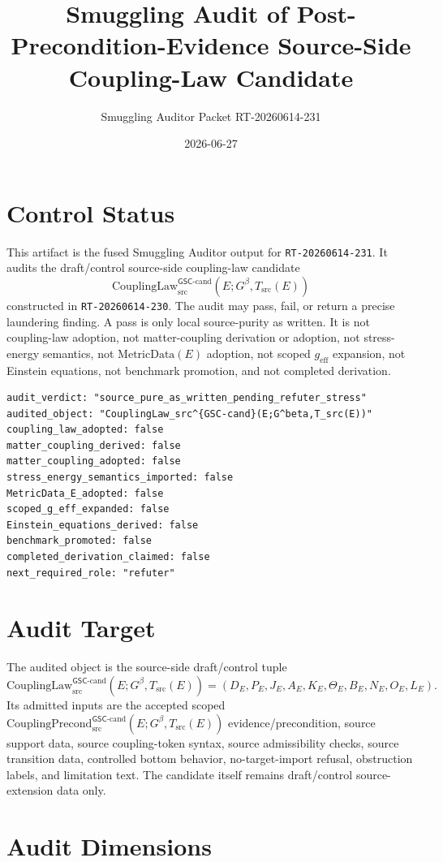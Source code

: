 \documentclass[11pt]{article}
\title{Smuggling Audit of Post-Precondition-Evidence Source-Side Coupling-Law Candidate}
\author{Smuggling Auditor Packet RT-20260614-231}
\date{2026-06-27}
\newcommand{\Gbeta}{G^\beta}
\newcommand{\geff}{g_{\mathrm{eff}}}
\newcommand{\CouplingPrecond}{\mathrm{CouplingPrecond}^{\mathsf{GSC}\mbox{-}\mathrm{cand}}_{\mathrm{src}}}
\newcommand{\CouplingLaw}{\mathrm{CouplingLaw}^{\mathsf{GSC}\mbox{-}\mathrm{cand}}_{\mathrm{src}}}
\newcommand{\MetricData}{\mathrm{MetricData}}
\begin{document}
\maketitle

\section{Control Status}

This artifact is the fused Smuggling Auditor output for
\texttt{RT-20260614-231}. It audits the draft/control source-side
coupling-law candidate
\[
  \CouplingLaw(E;\Gbeta,T_{\mathrm{src}}(E))
\]
constructed in \texttt{RT-20260614-230}. The audit may pass, fail, or return a
precise laundering finding. A pass is only local source-purity as written. It
is not coupling-law adoption, not matter-coupling derivation or adoption, not
stress-energy semantics, not \(\MetricData(E)\) adoption, not scoped
\(\geff\) expansion, not Einstein equations, not benchmark promotion, and not
completed derivation.

\begin{verbatim}
audit_verdict: "source_pure_as_written_pending_refuter_stress"
audited_object: "CouplingLaw_src^{GSC-cand}(E;G^beta,T_src(E))"
coupling_law_adopted: false
matter_coupling_derived: false
matter_coupling_adopted: false
stress_energy_semantics_imported: false
MetricData_E_adopted: false
scoped_g_eff_expanded: false
Einstein_equations_derived: false
benchmark_promoted: false
completed_derivation_claimed: false
next_required_role: "refuter"
\end{verbatim}

\section{Audit Target}

The audited object is the source-side draft/control tuple
\[
  \CouplingLaw(E;\Gbeta,T_{\mathrm{src}}(E)) =
  (D_E,P_E,J_E,A_E,K_E,\Theta_E,B_E,N_E,O_E,L_E).
\]
Its admitted inputs are the accepted scoped
\(\CouplingPrecond(E;\Gbeta,T_{\mathrm{src}}(E))\) evidence/precondition,
source support data, source coupling-token syntax, source admissibility
checks, source transition data, controlled bottom behavior, no-target-import
refusal, obstruction labels, and limitation text. The candidate itself
remains draft/control source-extension data only.

\section{Audit Dimensions}
\end{document}
